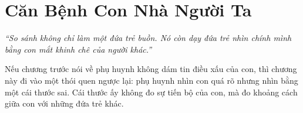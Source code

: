 \chapter{Căn Bệnh Con Nhà Người Ta}

\begin{center}
	\textit{\color{bookprimary}``So sánh không chỉ làm một đứa trẻ buồn. Nó còn dạy đứa trẻ nhìn chính mình bằng con mắt khinh chê của người khác.''}
\end{center}

\ngancach

\begin{tcolorbox}[
	colback=booksecondary!8,
	colframe=booksecondary!40,
	arc=5pt,
	title={\bfseries Điểm Nặng Của Chương},
	fonttitle=\bfseries\color{booksecondary}
]
Nếu chương trước nói về phụ huynh không dám tin điều xấu của con, thì chương này đi vào một thói quen ngược lại: phụ huynh nhìn con quá rõ nhưng nhìn bằng một cái thước sai. Cái thước ấy không đo sự tiến bộ của con, mà đo khoảng cách giữa con với những đứa trẻ khác.
\end{tcolorbox}

